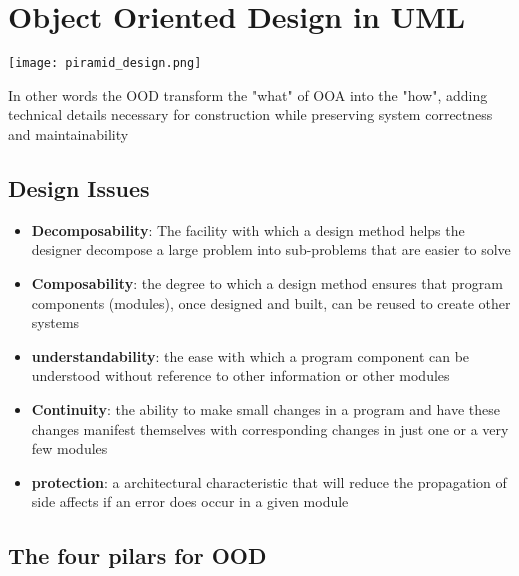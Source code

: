 \section{Object Oriented Design in UML}
\begin{center}
    \texttt{[image: piramid\_design.png]}
\end{center}

In other words the OOD transform the "what" of OOA into the "how", adding technical details necessary for construction while preserving system correctness and maintainability

\subsection{Design Issues}
\begin{itemize}
    \item \textbf{Decomposability}: The facility with which a design method helps the designer decompose a large problem into sub-problems that are easier to solve
    \item \textbf{Composability}: the degree to which a design method ensures that program components (modules), once designed and built, can be reused to create other systems
    \item \textbf{understandability}: the ease with which a program component can be understood without reference to other information or other modules
    \item \textbf{Continuity}: the ability to make small changes in a program and have these changes manifest themselves with corresponding changes in just one or a very few modules
    \item \textbf{protection}: a architectural characteristic that will reduce the propagation of side affects if an error does occur in a given module
\end{itemize}

\subsection{The four pilars for OOD}

